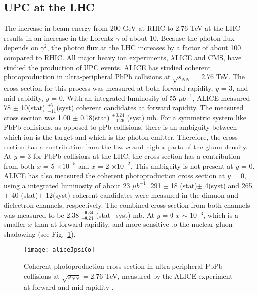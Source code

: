   \subsection{ UPC \JPsi{} at the LHC}
    The increase in beam energy from 200 GeV at RHIC to 2.76 TeV at the LHC 
      results in an increase in the Lorentz $\gamma$ of about 10.
    Because the photon flux depends on $\gamma^{2}$, the photon flux
      at the LHC increases by a factor of about 100 compared to RHIC.
    All major heavy ion experiments, ALICE and CMS, have studied the production
      of UPC events. 
    ALICE has studied coherent \JPsi{} photoproduction in ultra-peripheral PbPb
      collisions at $\sqrt{s_{NN}}$ = 2.76 TeV. 
   The cross section for this process was measured at both forward-rapidity, 
      $y$ = 3, and mid-rapidity, $y$ = 0.
   With an integrated luminosity of 55 $\mu$$b^{-1}$, ALICE measured 
     78 $\pm$ 10(stat) $^{+7}_{-11}$(syst) coherent \JPsi{} candidates at 
     forward rapidity.
   The measured cross section was 1.00 $\pm$ 0.18(stat) $_{-0.26}^{+0.24}$ 
    (syst) mb.
   For a symmetric system like PbPb collisions, as opposed to pPb collisions, 
    there is an ambiguity between which ion is the target and which is the 
    photon emitter. 
  Therefore, the cross section has a contribution from the low-$x$ and high-$x$ 
    parts of the gluon density. 
  At $y$ = 3  for PbPb collisions at the LHC, the cross section has a 
    contribution from both $x$ = 5 $\times 10^{-5}$ and $x$ = 2  $\times 
    10^{-2}$.
  This ambiguity is not present at $y$ = 0.
  ALICE has also measured the coherent \JPsi{} photoproduction cross section 
    at $y$ = 0, using a integrated luminosity of about 23 $\mu$$b^{-1}$.
  291 $\pm$ 18 (stat)$\pm$ 4(syst) and 265 $\pm$ 40 (stat)$\pm$ 12(syst) 
    coherent \JPsi{} candidates were measured in the dimuon and dielectron
    channels, respectively. 
  The combined cross section from both channels was measured to be 
    2.38 $_{-0.24}^{+0.34}$ (stat+syst) mb. 
  At $y$ = 0 $x$ $\sim$ 10$^{-3}$, which is a smaller $x$ than at forward 
    rapidity, and more sensitive to the nuclear gluon shadowing 
    (see Fig.~\ref{fig:aliceMoney}).
    \begin{figure}[!Hhbt]
      \centering
      \texttt{[image: aliceJpsiCo]}
      \caption{Coherent \JPsi{} photoproduction cross section in ultra-peripheral
        PbPb collisions at $\sqrt{s_{NN}}$ = 2.76 TeV, measured by the ALICE 
        experiment at forward and mid-rapidity \cite{}.}
      \label{fig:aliceMoney}
    \end{figure}

